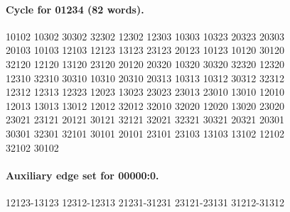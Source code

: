 \paragraph{Cycle for 01234 (82 words).}
\begingroup\footnotesize\ttfamily\begin{flushleft}
10102 10302 30302 32302 12302 12303 10303 10323 20323 20303\\
20103 10103 12103 12123 13123 23123 20123 10123 10120 30120\\
32120 12120 13120 23120 20120 20320 10320 30320 32320 12320\\
12310 32310 30310 10310 20310 20313 10313 10312 30312 32312\\
12312 12313 12323 12023 13023 23023 23013 23010 13010 12010\\
12013 13013 13012 12012 32012 32010 32020 12020 13020 23020\\
23021 23121 20121 30121 32121 32021 32321 30321 20321 20301\\
30301 32301 32101 30101 20101 23101 23103 13103 13102 12102\\
32102 30102\\
\end{flushleft}\endgroup
\paragraph{Auxiliary edge set for 00000:0.}
\begingroup\footnotesize\ttfamily\begin{flushleft}
12123-13123 12312-12313 21231-31231 23121-23131 31212-31312\\
\end{flushleft}\endgroup
